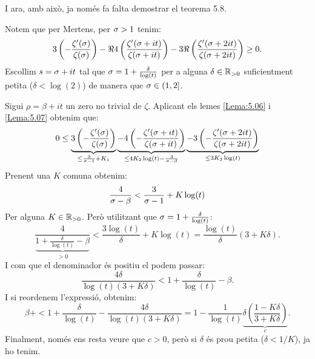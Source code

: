 I ara, amb això, ja només fa falta demostrar el teorema 5.8.\par
\begin{pf}

    Notem que per Mertens, per $\sigma>1$ tenim:
    \[
        3\left(-\frac{\zeta'(\sigma)}{\zeta(\sigma)}\right)
        -\Re4\left(\frac{\zeta'(\sigma+it)}{\zeta(\sigma+it)}\right)
        -3\Re\left(\frac{\zeta'(\sigma+2it)}{\zeta(\sigma+2it)}\right)\geq0.
    \]
    Escollim $s=\sigma+it$ tal que $\sigma=1+\frac{\delta}{\log(t)}$ per a alguna $\delta\in\mathbb R_{>0}$ suficientment petita ($\delta<\log(2)$) de manera que $\sigma\in(1,2]$.\par
    \begin{figure}
        \centering
    \end{figure}
    Sigui $\rho=\beta+it$ un zero no trivial de $\zeta$. Aplicant els lemes \ref{Lema:5.06} i \ref{Lema:5.07} obtenim que:
    \[
        0\leq\underbrace{3\left(-\frac{\zeta'(\sigma)}{\zeta(\sigma)}\right)}_{\leq \frac{3}{\sigma-1}+K_1}
        \underbrace{-4\left(-\frac{\zeta'(\sigma+it)}{\zeta(\sigma+it)}\right)}_{\leq 4K_2\log(t)-\frac{3}{\sigma-\beta}}
        \underbrace{-3\left(-\frac{\zeta'(\sigma+2it)}{\zeta(\sigma+2it)}\right)}_{\leq 3K_3\log(t)}
    \]
    Prenent una $K$ comuna obtenim:
    \[
        \frac{4}{\sigma-\beta}<\frac{3}{\sigma-1}+K\log(t)
    \]
    Per alguna $K\in\mathbb R_{>0}$. Però utilitzant que $\sigma=1+\frac{\delta}{\log(t)}$:
    \[
        \frac{4}{\underbrace{1+\frac{\delta}{\log(t)}-\beta}_{>0}}<\frac{3\log(t)}{\delta}+K\log(t)=\frac{\log(t)}{\delta}(3+K\delta).
    \]
    I com que el denominador és positiu el podem passar:
    \[
        \frac{4\delta}{\log(t)(3+K\delta)}<1+\frac{\delta}{\log(t)}-\beta.
    \]
    I si reordenem l'expressió, obtenim:
    \[
        \beta+
        <
        1+\frac{\delta}{\log(t)}
        -\frac{4\delta}{\log(t)(3+K\delta)}=
        1-\frac{1}{\log(t)}\underbrace{\delta\left(\frac{1-K\delta}{3+K\delta}\right)}_{c}.
    \]
    Finalment, només ens resta veure que $c>0$, però si $\delta$ és prou petita ($\delta<1/K$), ja ho tenim.
\end{pf}

\newpage
